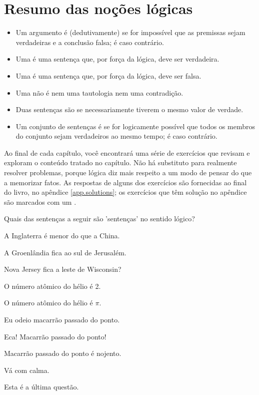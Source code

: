 \section*{Resumo das noções lógicas}
\begin{itemize}
\item Um argumento é (dedutivamente)  se for impossível que as premissas sejam verdadeiras e a conclusão falsa; é  caso contrário.

\item Uma  é uma sentença que, por força da lógica, deve ser verdadeira.

\item Uma  é uma sentença que, por força da lógica, deve ser falsa.

\item Uma  não é nem uma tautologia nem uma contradição.

\item Duas sentenças são  se necessariamente tiverem o mesmo valor de verdade.

\item Um conjunto de sentenças é  se for logicamente possível que todos os membros do conjunto sejam verdadeiros ao mesmo tempo; é  caso contrário.
\end{itemize}

\practiceproblems
Ao final de cada capítulo, você encontrará uma série de exercícios que revisam e exploram o conteúdo tratado no capítulo. Não há substituto para realmente resolver problemas, porque lógica diz mais respeito a um modo de pensar do que a memorizar fatos. As respostas de alguns dos exercícios são fornecidas ao final do livro, no apêndice \ref{app.solutions}; os exercícios que têm solução no apêndice são marcados com um \solutions.

\problempart
Quais das sentenças a seguir são 'sentenças' no sentido lógico?
\begin{earg}
\item A Inglaterra é menor do que a China.
\item A Groenlândia fica ao sul de Jerusalém.
\item Nova Jersey fica a leste de Wisconsin?
\item O número atômico do hélio é 2.
\item O número atômico do hélio é $\pi$.
\item Eu odeio macarrão passado do ponto.
\item Eca! Macarrão passado do ponto!
\item Macarrão passado do ponto é nojento.
\item Vá com calma.
\item Esta é a última questão.
\end{earg}

